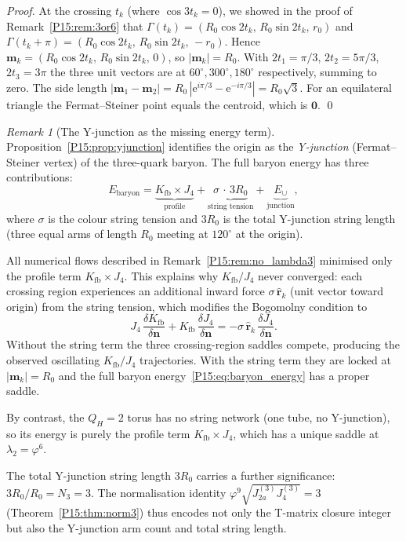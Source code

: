 \documentclass[11pt,a4paper]{article}
\theoremstyle{definition}\newtheorem{definition}[theorem]{Definition}
\theoremstyle{remark}
\newtheorem{remark}[theorem]{Remark}
\newcommand{\vp}{\varphi}
\newcommand{\lam}{\lambda}
\newcommand{\Ja}{J_{2a}}
\newcommand{\QH}{Q_H}
\begin{document}
\begin{proof}
At the crossing $t_k$ (where $\cos 3t_k=0$), we showed in the proof
of Remark~\ref{P15:rem:3or6} that $\Gamma(t_k)=(R_0\cos 2t_k,\, R_0\sin 2t_k,\, r_0)$
and $\Gamma(t_k+\pi)=(R_0\cos 2t_k,\, R_0\sin 2t_k,\, -r_0)$.
Hence $\mathbf{m}_k=(R_0\cos 2t_k,\, R_0\sin 2t_k,\, 0)$,
so $|\mathbf{m}_k|=R_0$.
With $2t_1=\pi/3$, $2t_2=5\pi/3$, $2t_3=3\pi$ the three unit vectors
are at $60^\circ, 300^\circ, 180^\circ$ respectively, summing to zero.
The side length $|\mathbf{m}_1-\mathbf{m}_2|=R_0\,|\mathrm{e}^{i\pi/3}
-\mathrm{e}^{-i\pi/3}|=R_0\sqrt{3}$.
For an equilateral triangle the Fermat--Steiner point equals the
centroid, which is $\mathbf{0}$.
\qed
\end{proof}

\begin{remark}[The Y-junction as the missing energy term]
\label{P15:rem:yjunction_energy}
Proposition~\ref{P15:prop:yjunction} identifies the origin as the
\emph{Y-junction} (Fermat--Steiner vertex) of the three-quark baryon.
The full baryon energy has three contributions:
\begin{equation}
  E_{\mathrm{baryon}} = \underbrace{K_{\mathrm{fb}}\times J_4}_{\text{profile}}
  + \underbrace{\sigma\,\cdot\,3R_0}_{\text{string tension}}
  + \underbrace{E_\cup}_{\text{junction}},
  \label{P15:eq:baryon_energy}
\end{equation}
where $\sigma$ is the colour string tension and $3R_0$ is the
total Y-junction string length (three equal arms of length $R_0$
meeting at $120^\circ$ at the origin).

All numerical flows described in Remark~\ref{P15:rem:no_lambda3}
minimised only the profile term $K_{\mathrm{fb}}\times J_4$.
This explains why $K_{\mathrm{fb}}/J_4$ never converged: each
crossing region experiences an additional inward force
$\sigma\,\hat{\mathbf{r}}_k$ (unit vector toward origin) from
the string tension, which modifies the Bogomolny condition to
\begin{equation}
  J_4\,\frac{\delta K_{\mathrm{fb}}}{\delta\mathbf{n}}
  + K_{\mathrm{fb}}\,\frac{\delta J_4}{\delta\mathbf{n}}
  = -\sigma\,\hat{\mathbf{r}}_k\,\frac{\delta J_4}{\delta\mathbf{n}}.
  \label{P15:eq:modified_bogomolny}
\end{equation}
Without the string term the three crossing-region saddles compete,
producing the observed oscillating $K_{\mathrm{fb}}/J_4$ trajectories.
With the string term they are locked at $|\mathbf{m}_k|=R_0$ and
the full baryon energy~\eqref{P15:eq:baryon_energy} has a proper saddle.

By contrast, the $\QH=2$ torus has no string network (one tube,
no Y-junction), so its energy is purely the profile term
$K_{\mathrm{fb}}\times J_4$, which has a unique saddle at $\lam_2=\vp^6$.

The total Y-junction string length $3R_0$ carries a further
significance: $3R_0/R_0 = N_3 = 3$.
The normalisation identity $\vp^9\sqrt{\Ja^{(3)}J_4^{(3)}}=3$
(Theorem~\ref{P15:thm:norm3}) thus encodes not only the T-matrix closure
integer but also the Y-junction arm count and total string length.
\end{remark}
\end{document}
